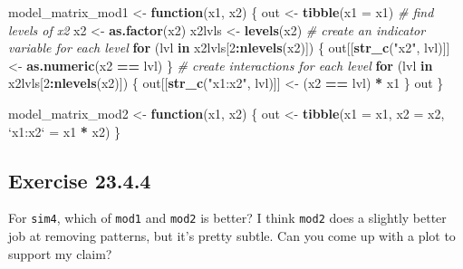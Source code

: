 \documentclass[]{book}
\newenvironment{Shaded}{\begin{snugshade}}{\end{snugshade}}
\newcommand{\CommentTok}[1]{\textcolor[rgb]{0.56,0.35,0.01}{\textit{#1}}}
\newcommand{\ControlFlowTok}[1]{\textcolor[rgb]{0.13,0.29,0.53}{\textbf{#1}}}
\newcommand{\DataTypeTok}[1]{\textcolor[rgb]{0.13,0.29,0.53}{#1}}
\newcommand{\DecValTok}[1]{\textcolor[rgb]{0.00,0.00,0.81}{#1}}
\newcommand{\KeywordTok}[1]{\textcolor[rgb]{0.13,0.29,0.53}{\textbf{#1}}}
\newcommand{\NormalTok}[1]{#1}
\newcommand{\OperatorTok}[1]{\textcolor[rgb]{0.81,0.36,0.00}{\textbf{#1}}}
\newcommand{\StringTok}[1]{\textcolor[rgb]{0.31,0.60,0.02}{#1}}
\theoremstyle{plain}
\theoremstyle{remark}
\begin{document}
\begin{Shaded}
\begin{Highlighting}[]
\NormalTok{model_matrix_mod1 <-}\StringTok{ }\ControlFlowTok{function}\NormalTok{(x1, x2) \{}
\NormalTok{  out <-}\StringTok{ }\KeywordTok{tibble}\NormalTok{(}\DataTypeTok{x1 =}\NormalTok{ x1)  }
  \CommentTok{# find levels of x2}
\NormalTok{  x2 <-}\StringTok{ }\KeywordTok{as.factor}\NormalTok{(x2)}
\NormalTok{  x2lvls <-}\StringTok{ }\KeywordTok{levels}\NormalTok{(x2)}
  \CommentTok{# create an indicator variable for each level}
  \ControlFlowTok{for}\NormalTok{ (lvl }\ControlFlowTok{in}\NormalTok{ x2lvls[}\DecValTok{2}\OperatorTok{:}\KeywordTok{nlevels}\NormalTok{(x2)]) \{}
\NormalTok{    out[[}\KeywordTok{str_c}\NormalTok{(}\StringTok{"x2"}\NormalTok{, lvl)]] <-}\StringTok{ }\KeywordTok{as.numeric}\NormalTok{(x2 }\OperatorTok{==}\StringTok{ }\NormalTok{lvl)}
\NormalTok{  \}}
  \CommentTok{# create interactions for each level}
  \ControlFlowTok{for}\NormalTok{ (lvl }\ControlFlowTok{in}\NormalTok{ x2lvls[}\DecValTok{2}\OperatorTok{:}\KeywordTok{nlevels}\NormalTok{(x2)]) \{}
\NormalTok{    out[[}\KeywordTok{str_c}\NormalTok{(}\StringTok{"x1:x2"}\NormalTok{, lvl)]] <-}\StringTok{ }\NormalTok{(x2 }\OperatorTok{==}\StringTok{ }\NormalTok{lvl) }\OperatorTok{*}\StringTok{ }\NormalTok{x1}
\NormalTok{  \}}
\NormalTok{  out}
\NormalTok{\}}
\end{Highlighting}
\end{Shaded}

\begin{Shaded}
\begin{Highlighting}[]
\NormalTok{model_matrix_mod2 <-}\StringTok{ }\ControlFlowTok{function}\NormalTok{(x1, x2) \{}
\NormalTok{  out <-}\StringTok{ }\KeywordTok{tibble}\NormalTok{(}\DataTypeTok{x1 =}\NormalTok{ x1,}
                \DataTypeTok{x2 =}\NormalTok{ x2,}
                \StringTok{`}\DataTypeTok{x1:x2}\StringTok{`}\NormalTok{ =}\StringTok{ }\NormalTok{x1 }\OperatorTok{*}\StringTok{ }\NormalTok{x2)}
\NormalTok{\}}
\end{Highlighting}
\end{Shaded}

\hypertarget{exercise-23.4.4}{%
\subsection*{\texorpdfstring{Exercise
{23.4.4}}{Exercise 23.4.4}}\label{exercise-23.4.4}}

For \texttt{sim4}, which of \texttt{mod1} and \texttt{mod2} is better? I
think \texttt{mod2} does a slightly better job at removing patterns, but
it's pretty subtle. Can you come up with a plot to support my claim?
\end{document}
